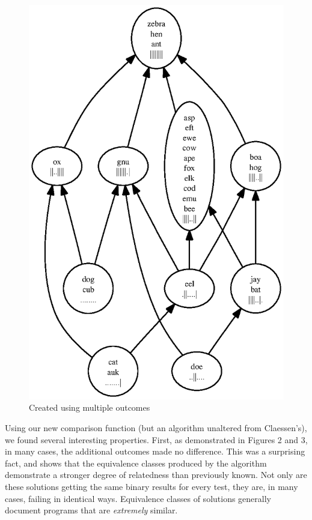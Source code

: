 \documentclass[11pt,twoside]{article}
\begin{document}
\begin{figure}
\includegraphics[scale=0.75]{rank2.ps}
\caption{Created using multiple outcomes}
\end{figure}

Using our new comparison function (but an algorithm unaltered from Claessen's), we found several interesting properties. First, as demonstrated in Figures 2 and 3, in many cases, the additional outcomes made no difference. This was a surprising fact, and shows that the equivalence classes produced by the algorithm demonstrate a stronger degree of relatedness than previously known. Not only are these solutions getting the same binary results for every test, they are, in many cases, failing in  identical ways. Equivalence classes of solutions generally document programs that are \emph{extremely} similar.
\end{document}

